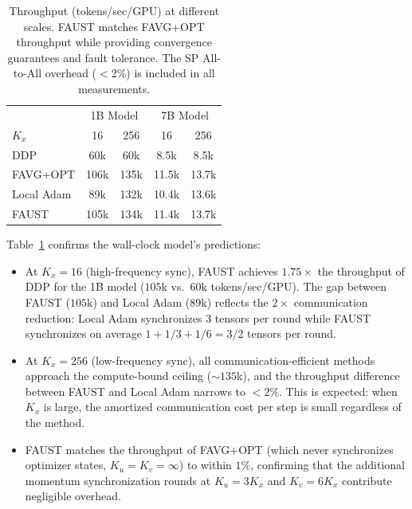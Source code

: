\documentclass{article}
\begin{document}
\begin{table}[ht]
\centering
\caption{Throughput (tokens/sec/GPU) at different scales. FAUST
matches FAVG+OPT throughput while providing convergence guarantees and
fault tolerance. The SP All-to-All overhead ($<2\%$) is included in all
measurements.}
\label{tab:throughput2}
\begin{tabular}{l|cc|cc}
\toprule
& \multicolumn{2}{c|}{1B Model} & \multicolumn{2}{c}{7B Model} \\
$K_x$ & 16 & 256 & 16 & 256 \\
\midrule
DDP          & 60k & 60k & 8.5k & 8.5k \\
FAVG+OPT     & 106k & 135k & 11.5k & 13.7k \\
Local Adam   & 89k & 132k & 10.4k & 13.6k \\
FAUST   & 105k & 134k & 11.4k & 13.7k \\
\bottomrule
\end{tabular}
\end{table}

Table~\ref{tab:throughput2} confirms the wall-clock model's predictions:

\begin{itemize}
\item At $K_x = 16$ (high-frequency sync), FAUST achieves $1.75\times$
the throughput of DDP for the 1B model ($105$k vs.\ $60$k tokens/sec/GPU).
The gap between FAUST ($105$k) and Local Adam ($89$k) reflects the
$2\times$ communication reduction: Local Adam synchronizes $3$ tensors per
round while FAUST synchronizes on average
$1 + 1/3 + 1/6 = 3/2$ tensors per round.

\item At $K_x = 256$ (low-frequency sync), all communication-efficient
methods approach the compute-bound ceiling ($\sim 135$k), and the
throughput difference between FAUST and Local Adam narrows to $<2\%$.
This is expected: when $K_x$ is large, the amortized communication cost
per step is small regardless of the method.

\item FAUST matches the throughput of FAVG+OPT (which never
synchronizes optimizer states, $K_u = K_v = \infty$) to within $1\%$,
confirming that the additional momentum synchronization rounds at
$K_u = 3K_x$ and $K_v = 6K_x$ contribute negligible overhead.
\end{itemize}

\end{document}
